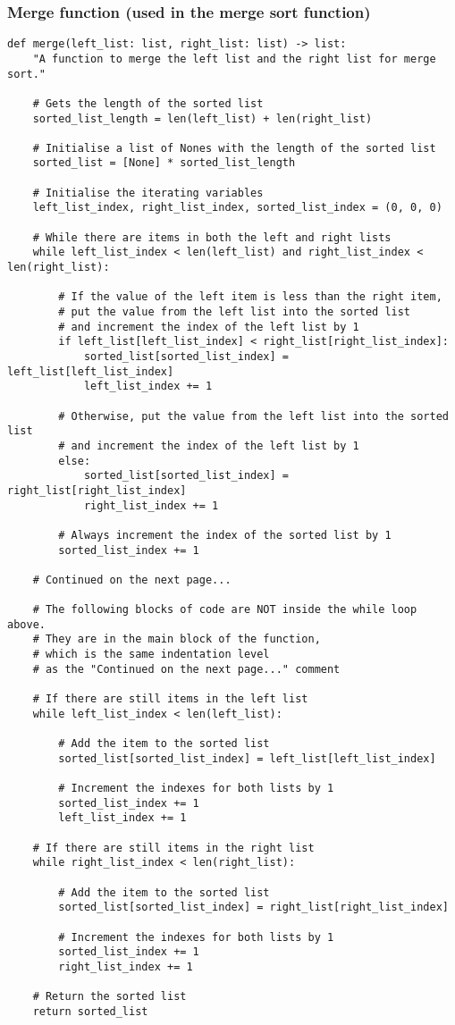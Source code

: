 \documentclass[11pt]{article}
\begin{document}
\subsubsection{Merge function (used in the merge sort function)}
\label{sec:org2cde635}
\begin{verbatim}
def merge(left_list: list, right_list: list) -> list:
    "A function to merge the left list and the right list for merge sort."

    # Gets the length of the sorted list
    sorted_list_length = len(left_list) + len(right_list)

    # Initialise a list of Nones with the length of the sorted list
    sorted_list = [None] * sorted_list_length

    # Initialise the iterating variables
    left_list_index, right_list_index, sorted_list_index = (0, 0, 0)

    # While there are items in both the left and right lists
    while left_list_index < len(left_list) and right_list_index < len(right_list):

        # If the value of the left item is less than the right item,
        # put the value from the left list into the sorted list
        # and increment the index of the left list by 1
        if left_list[left_list_index] < right_list[right_list_index]:
            sorted_list[sorted_list_index] = left_list[left_list_index]
            left_list_index += 1

        # Otherwise, put the value from the left list into the sorted list
        # and increment the index of the left list by 1
        else:
            sorted_list[sorted_list_index] = right_list[right_list_index]
            right_list_index += 1

        # Always increment the index of the sorted list by 1
        sorted_list_index += 1

    # Continued on the next page...

    # The following blocks of code are NOT inside the while loop above.
    # They are in the main block of the function,
    # which is the same indentation level
    # as the "Continued on the next page..." comment

    # If there are still items in the left list
    while left_list_index < len(left_list):

        # Add the item to the sorted list
        sorted_list[sorted_list_index] = left_list[left_list_index]

        # Increment the indexes for both lists by 1
        sorted_list_index += 1
        left_list_index += 1

    # If there are still items in the right list
    while right_list_index < len(right_list):

        # Add the item to the sorted list
        sorted_list[sorted_list_index] = right_list[right_list_index]

        # Increment the indexes for both lists by 1
        sorted_list_index += 1
        right_list_index += 1

    # Return the sorted list
    return sorted_list
\end{verbatim}
\end{document}
